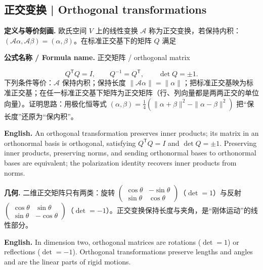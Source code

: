 \documentclass[UTF8,11pt,a4paper]{ctexart}
\newcommand{\EN}[1]{\par\noindent\textbf{English.} #1\par}
\newcommand{\FORMULA}[2]{\par\noindent\textbf{公式名称 / Formula name.} #1 / #2\par}
\begin{document}
\subsection{正交变换 | Orthogonal transformations}
\noindent\textbf{定义与等价刻画.} 欧氏空间 $V$ 上的线性变换 $\mathcal A$ 称为正交变换，若保持内积：$(\mathcal A\alpha,\mathcal A\beta)=(\alpha,\beta)$。在标准正交基下的矩阵 $Q$ 满足
\FORMULA{正交矩阵}{orthogonal matrix}
\[
Q^{\mathsf T}Q=I,\qquad Q^{-1}=Q^{\mathsf T},\qquad \det Q=\pm1.
\]
下列条件等价：$\mathcal A$ 保持内积；保持长度 $\|\mathcal A\alpha\|=\|\alpha\|$；把标准正交基映为标准正交基；在任一标准正交基下矩阵为正交矩阵（行、列向量都是两两正交的单位向量）。证明思路：用极化恒等式 $(\alpha,\beta)=\tfrac14(\|\alpha+\beta\|^2-\|\alpha-\beta\|^2)$ 把“保长度”还原为“保内积”。
\EN{An orthogonal transformation preserves inner products; its matrix in an orthonormal basis is orthogonal, satisfying $Q^{\mathsf T}Q=I$ and $\det Q=\pm1$. Preserving inner products, preserving norms, and sending orthonormal bases to orthonormal bases are equivalent; the polarization identity recovers inner products from norms.}
\noindent\textbf{几何.} 二维正交矩阵只有两类：旋转 $\begin{pmatrix}\cos\theta&-\sin\theta\\\sin\theta&\cos\theta\end{pmatrix}$（$\det=1$）与反射 $\begin{pmatrix}\cos\theta&\sin\theta\\\sin\theta&-\cos\theta\end{pmatrix}$（$\det=-1$）。正交变换保持长度与夹角，是“刚体运动”的线性部分。
\EN{In dimension two, orthogonal matrices are rotations ($\det=1$) or reflections ($\det=-1$). Orthogonal transformations preserve lengths and angles and are the linear parts of rigid motions.}
\end{document}
